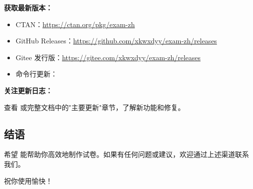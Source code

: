 \textbf{获取最新版本：}

\begin{itemize}
  \item CTAN：\url{https://ctan.org/pkg/exam-zh}
  \item GitHub Releases：\url{https://github.com/xkwxdyy/exam-zh/releases}
  \item Gitee 发行版：\url{https://gitee.com/xkwxdyy/exam-zh/releases}
  \item 命令行更新：
\end{itemize}

\textbf{关注更新日志：}

查看  或完整文档中的"主要更新"章节，了解新功能和修复。


\subsection{结语}

希望  能帮助你高效地制作试卷。如果有任何问题或建议，欢迎通过上述渠道联系我们。

祝你使用愉快！
